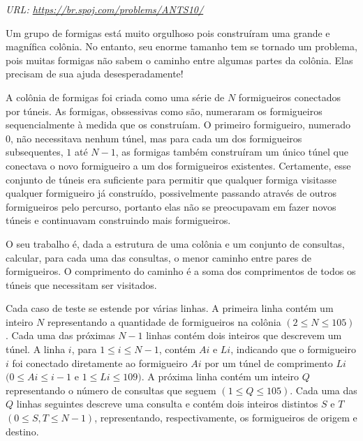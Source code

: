 {

\textit{URL: \url{https://br.spoj.com/problems/ANTS10/}}

\vspace{0.3cm}

\begin{mdframed}[backgroundcolor=blue!5]
\vspace{-0.5cm}

\vspace{0.2cm}

Um grupo de formigas está muito orgulhoso pois construíram uma grande e magnífica colônia. No entanto, seu enorme tamanho tem se tornado um problema, pois muitas formigas não sabem o caminho entre algumas partes da colônia. Elas precisam de sua ajuda desesperadamente!

A colônia de formigas foi criada como uma série de $N$ formigueiros conectados por túneis. As formigas, obssessivas como são, numeraram os formigueiros sequencialmente à medida que os construíam. O primeiro formigueiro, numerado $0$, não necessitava nenhum túnel, mas para cada um dos formigueiros subsequentes, $1$ até $N-1$, as formigas também construíram um único túnel que conectava o novo formigueiro a um dos formigueiros existentes. Certamente, esse conjunto de túneis era suficiente para permitir que qualquer formiga visitasse qualquer formigueiro já construído, possivelmente passando através de outros formigueiros pelo percurso, portanto elas não se preocupavam em fazer novos túneis e continuavam construindo mais formigueiros.

O seu trabalho é, dada a estrutura de uma colônia e um conjunto de consultas, calcular, para cada uma das consultas, o menor caminho entre pares de formigueiros. O comprimento do caminho é a soma dos comprimentos de todos os túneis que necessitam ser visitados.

\vspace{0.2cm}

Cada caso de teste se estende por várias linhas. A primeira linha contém um inteiro $N$ representando a quantidade de formigueiros na colônia $(2 \leq N \leq 105)$. Cada uma das próximas $N-1$ linhas contém dois inteiros que descrevem um túnel. A linha $i$, para $1 \leq i \leq N-1$, contém $Ai$ e $Li$, indicando que o formigueiro $i$ foi conectado diretamente ao formigueiro $Ai$ por um túnel de comprimento $Li$ $(0 \leq Ai\leq i-1$ e $1 \leq Li \leq 109)$. A próxima linha contém um inteiro $Q$ representando o número de consultas que seguem $(1 \leq Q \leq 105)$. Cada uma das $Q$ linhas seguintes descreve uma consulta e contém dois inteiros distintos $S$ e $T$ $(0 \leq S,T \leq N-1)$, representando, respectivamente, os formigueiros de origem e destino.


\end{mdframed}}
